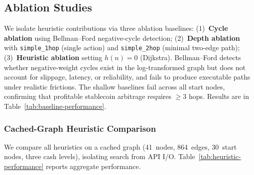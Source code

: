 \subsection{Ablation Studies}

We isolate heuristic contributions via three ablation baselines: (1)~\textbf{Cycle ablation} using Bellman--Ford negative-cycle detection; (2)~\textbf{Depth ablation} with \texttt{simple\_1hop} (single action) and \texttt{simple\_2hop} (minimal two-edge path); (3)~\textbf{Heuristic ablation} setting $h(n)=0$ (Dijkstra). Bellman--Ford detects whether negative-weight cycles exist in the log-transformed graph but does not account for slippage, latency, or reliability, and fails to produce executable paths under realistic frictions. The shallow baselines fail across all start nodes, confirming that profitable stablecoin arbitrage requires $\geq$3 hops. Results are in Table~\ref{tab:baseline-performance}.

\subsubsection{Cached-Graph Heuristic Comparison}
\label{sec:deterministic-compare}

We compare all heuristics on a cached graph (41~nodes, 864~edges, 30~start nodes, three cash levels), isolating search from API I/O. Table~\ref{tab:heuristic-performance} reports aggregate performance.

